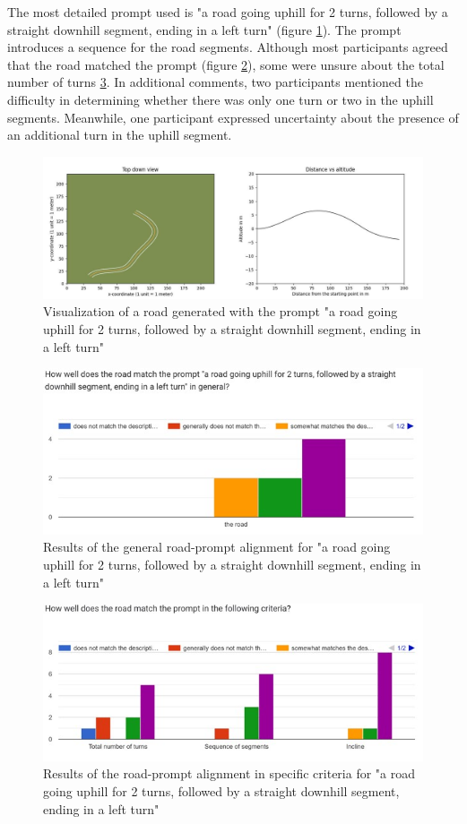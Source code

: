 The most detailed prompt used is "a road going uphill for 2 turns, followed by a straight downhill segment, ending in a left turn" (figure \ref{most-specific-vis}). The prompt introduces a sequence for the road segments. Although most participants agreed that the road matched the prompt (figure \ref{most-specific-general}), some were unsure about the total number of turns \ref{most-specific-specific-criteria}. In additional comments, two participants mentioned the difficulty in determining whether there was only one turn or two in the uphill segments. Meanwhile, one participant expressed uncertainty about the presence of an additional turn in the uphill segment.

\begin{figure}[H]
    \centering
    \includegraphics[width=0.75\linewidth]{images/road_height.jpg}
    \caption{Visualization of a road generated with the prompt "a road going uphill for 2 turns, followed by a straight downhill segment, ending in a left turn"}
    \label{most-specific-vis}
\end{figure}

\begin{figure}[H]
    \centering
    \includegraphics[width=0.75\linewidth]{images/most_specific_general.jpg}
    \caption{Results of the general road-prompt alignment for "a road going uphill for 2 turns, followed by a straight downhill segment, ending in a left turn"}
    \label{most-specific-general}
\end{figure}

\begin{figure}[H]
    \centering
    \includegraphics[width=0.75\linewidth]{images/most_specific_specific.jpg}
    \caption{Results of the road-prompt alignment in specific criteria for "a road going uphill for 2 turns, followed by a straight downhill segment, ending in a left turn"}
    \label{most-specific-specific-criteria}
\end{figure}


